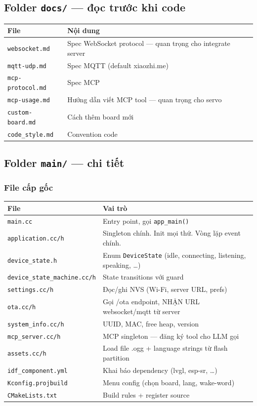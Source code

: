 \documentclass[11pt,a4paper]{article}
\begin{document}
\subsection{Folder \texttt{docs/} — đọc trước khi code}
\begin{tabularx}{\textwidth}{l|Y}
\toprule
\textbf{File} & \textbf{Nội dung}\\
\midrule
\texttt{websocket.md} & Spec WebSocket protocol — quan trọng cho integrate server\\
\texttt{mqtt-udp.md} & Spec MQTT (default xiaozhi.me)\\
\texttt{mcp-protocol.md} & Spec MCP\\
\texttt{mcp-usage.md} & Hướng dẫn viết MCP tool — quan trọng cho servo\\
\texttt{custom-board.md} & Cách thêm board mới\\
\texttt{code\_style.md} & Convention code\\
\bottomrule
\end{tabularx}

\subsection{Folder \texttt{main/} — chi tiết}

\subsubsection{File cấp gốc}
\begin{tabularx}{\textwidth}{l|Y}
\toprule
\textbf{File} & \textbf{Vai trò}\\
\midrule
\texttt{main.cc} & Entry point, gọi \texttt{app\_main()}\\
\texttt{application.cc/h} & Singleton chính. Init mọi thứ. Vòng lặp event chính.\\
\texttt{device\_state.h} & Enum \texttt{DeviceState} (idle, connecting, listening, speaking, \ldots)\\
\texttt{device\_state\_machine.cc/h} & State transitions với guard\\
\texttt{settings.cc/h} & Đọc/ghi NVS (Wi-Fi, server URL, prefs)\\
\texttt{ota.cc/h} & Gọi /ota endpoint, NHẬN URL websocket/mqtt từ server\\
\texttt{system\_info.cc/h} & UUID, MAC, free heap, version\\
\texttt{mcp\_server.cc/h} & MCP singleton — đăng ký tool cho LLM gọi\\
\texttt{assets.cc/h} & Load file .ogg + language strings từ flash partition\\
\texttt{idf\_component.yml} & Khai báo dependency (lvgl, esp-sr, \ldots)\\
\texttt{Kconfig.projbuild} & Menu config (chọn board, lang, wake-word)\\
\texttt{CMakeLists.txt} & Build rules + register source\\
\bottomrule
\end{tabularx}
\end{document}
